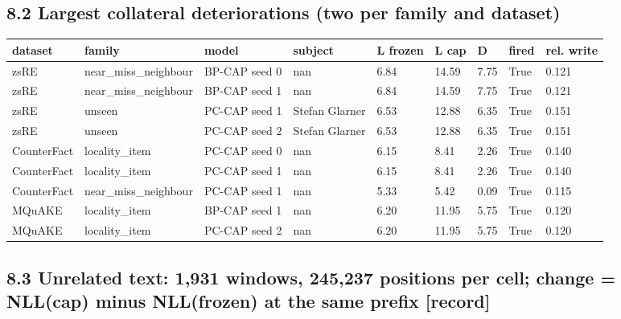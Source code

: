 \documentclass[10pt,a4paper]{article}
\begin{document}
\subsection*{8.2 Largest collateral deteriorations (two per family and dataset)}



\begin{center}\scriptsize
\begin{tabularx}{\textwidth}{@{}p{}XXXXXXXX@{}}
\toprule
dataset & family & model & subject & L frozen & L cap & D & fired & rel. write \\ \midrule
zsRE & near\_miss\_neighbour & BP-CAP seed 0 & nan & 6.84 & 14.59 & 7.75 & True & 0.121 \\
zsRE & near\_miss\_neighbour & BP-CAP seed 1 & nan & 6.84 & 14.59 & 7.75 & True & 0.121 \\
zsRE & unseen & PC-CAP seed 1 & Stefan Glarner & 6.53 & 12.88 & 6.35 & True & 0.151 \\
zsRE & unseen & PC-CAP seed 2 & Stefan Glarner & 6.53 & 12.88 & 6.35 & True & 0.151 \\
CounterFact & locality\_item & PC-CAP seed 0 & nan & 6.15 & 8.41 & 2.26 & True & 0.140 \\
CounterFact & locality\_item & PC-CAP seed 1 & nan & 6.15 & 8.41 & 2.26 & True & 0.140 \\
CounterFact & near\_miss\_neighbour & PC-CAP seed 1 & nan & 5.33 & 5.42 & 0.09 & True & 0.115 \\
MQuAKE & locality\_item & BP-CAP seed 1 & nan & 6.20 & 11.95 & 5.75 & True & 0.120 \\
MQuAKE & locality\_item & PC-CAP seed 2 & nan & 6.20 & 11.95 & 5.75 & True & 0.120 \\
\bottomrule
\end{tabularx}
\end{center}



\subsection*{8.3 Unrelated text: 1,931 windows, 245,237 positions per cell; change = NLL(cap) minus NLL(frozen) at the same prefix [record]}
\end{document}

